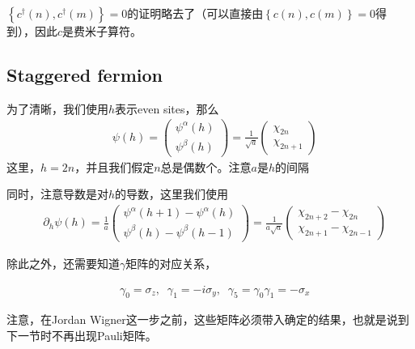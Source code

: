 $\left\{c^{\dagger}(n), c^{\dagger}(m)\right\} =0$的证明略去了（可以直接由$\left\{c(n), c(m)\right\} =0$得到），因此$c$是费米子算符。


\subsection{Staggered fermion}

为了清晰，我们使用$h$表示even sites，那么
\begin{equation}
\begin{split}
&\psi(h) =\begin{pmatrix} \psi^{\alpha} (h)  \\ \psi^{\beta}(h) \end{pmatrix}= \frac{1}{\sqrt{a}}\begin{pmatrix} \chi _{2n}  \\ \chi _{2n+1} \end{pmatrix}
\end{split}
\end{equation}
这里，$h=2n$，并且我们假定$n$总是偶数个。注意$a$是$h$的间隔

同时，注意导数是对$h$的导数，这里我们使用
\begin{equation}
\begin{split}
&\partial _h \psi(h) = \frac{1}{a} \begin{pmatrix} \psi^{\alpha}(h+1) - \psi^{\alpha} (h) \\ \psi^{\beta}(h) - \psi ^{\beta}(h-1) \end{pmatrix} = \frac{1}{a\sqrt{a}} \begin{pmatrix} \chi_{2n+2} -\chi_{2n} \\ \chi_{2n+1} - \chi _{2n-1} \end{pmatrix} 
\end{split}
\end{equation}

除此之外，还需要知道$\gamma$矩阵的对应关系，

\begin{equation}
\begin{split}
&\gamma _0=\sigma _z, \;\; \gamma _1=-i\sigma _y, \;\; \gamma _5=\gamma _0\gamma _1 = -\sigma _x
\end{split}
\end{equation}

注意，在Jordan Wigner这一步之前，这些矩阵必须带入确定的结果，也就是说到下一节时不再出现Pauli矩阵。

